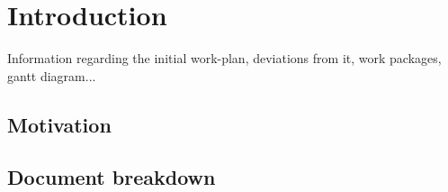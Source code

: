 \chapter{Introduction}

Information regarding the initial work-plan, deviations from it, work packages, gantt diagram...

\section{Motivation}

\section{Document breakdown}
